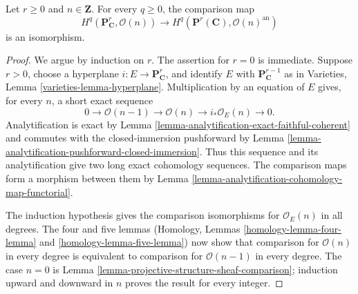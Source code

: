 \begin{lemma}
\label{lemma-projective-twist-comparison}
Let $r \geq 0$ and $n \in \mathbf Z$. For every $q \geq 0$, the comparison
map
$$
H^q(\mathbf P^r_{\mathbf C},\mathcal O(n))
\longrightarrow
H^q(\mathbf P^r(\mathbf C),\mathcal O(n)^{\mathrm{an}})
$$
is an isomorphism.
\end{lemma}

\begin{proof}
We argue by induction on $r$. The assertion for $r=0$ is immediate. Suppose
$r>0$, choose a hyperplane
$i:E\longrightarrow\mathbf P^r_{\mathbf C}$, and identify $E$ with
$\mathbf P^{r-1}_{\mathbf C}$ as in Varieties, Lemma
\ref{varieties-lemma-hyperplane}. Multiplication by an equation of $E$ gives,
for every $n$, a short exact sequence
$$
0\longrightarrow\mathcal O(n-1)\longrightarrow\mathcal O(n)
\longrightarrow i_*\mathcal O_E(n)\longrightarrow0.
$$
Analytification is exact by Lemma
\ref{lemma-analytification-exact-faithful-coherent} and commutes with the
closed-immersion pushforward by Lemma
\ref{lemma-analytification-pushforward-closed-immersion}. Thus this sequence
and its analytification give two long exact cohomology sequences. The
comparison maps form a morphism between them by Lemma
\ref{lemma-analytification-cohomology-map-functorial}.

The induction hypothesis gives the comparison isomorphisms for
$\mathcal O_E(n)$ in all degrees. The four and five lemmas (Homology, Lemmas
\ref{homology-lemma-four-lemma} and \ref{homology-lemma-five-lemma}) now show
that comparison for $\mathcal O(n)$ in every degree is equivalent to
comparison for $\mathcal O(n-1)$ in every degree. The case $n=0$ is Lemma
\ref{lemma-projective-structure-sheaf-comparison}; induction upward and
downward in $n$ proves the result for every integer.
\end{proof}

